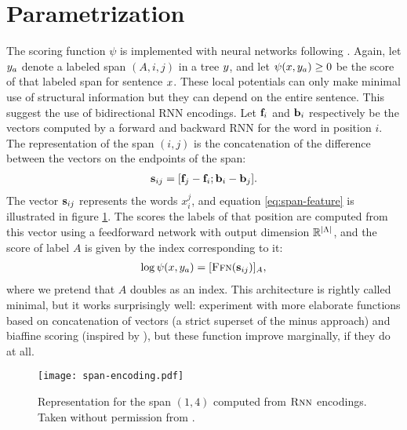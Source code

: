 \section{Parametrization}
  The scoring function $\psi$ is implemented with neural networks following \citet{stern2017minimal}. Again, let $y_a$ denote a labeled span $(A, i, j)$ in a tree $y$, and let $\psi(x, y_a) \geq 0$ be the score of that labeled span for sentence $x$. These local potentials can only make minimal use of structural information but they can depend on the entire sentence. This suggest the use of bidirectional RNN encodings. Let $\mathbf{f}_i$ and $\mathbf{b}_i$ respectively be the vectors computed by a forward and backward RNN for the word in position $i$. The representation of the span $(i, j)$ is the concatenation of the difference between the vectors on the endpoints of the span:
  \begin{align}
    \label{eq:span-feature}
    \mathbf{s}_{ij} = [\mathbf{f}_j - \mathbf{f}_i; \mathbf{b}_i - \mathbf{b}_j].
  \end{align}
  The vector $\mathbf{s}_{ij}$ represents the words $x_i^j$, and equation \ref{eq:span-feature} is illustrated in figure \ref{fig:span-feature}. The scores the labels of that position are computed from this vector using a feedforward network with output dimension $\mathbb{R}^{\lvert \Lambda \rvert}$, and the score of label $A$ is given by the index corresponding to it:
  \begin{align}
    \label{eq:potential-function}
    \log \psi(x, y_a) = [ \textsc{Ffn}( \mathbf{s}_{ij} ) ]_{A},
  \end{align}
  where we pretend that $A$ doubles as an index. This architecture is rightly called minimal, but it works surprisingly well: \citet{stern2017minimal} experiment with more elaborate functions based on concatenation of vectors (a strict superset of the minus approach) and biaffine scoring (inspired by \citet{dozat2016deep}), but these function improve marginally, if they do at all.

  \begin{figure}
    \texttt{[image: span-encoding.pdf]}
    \caption{Representation for the span $(1, 4)$ computed from $\textsc{Rnn}$ encodings. Taken without permission from \citet{stern2018analyis}.}
    \label{fig:span-feature}
  \end{figure}

